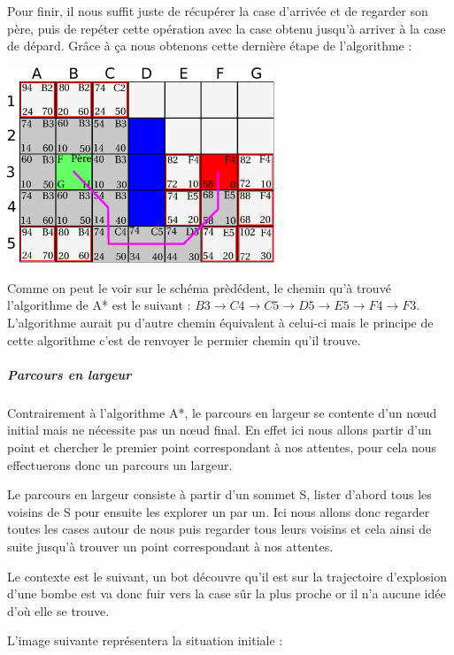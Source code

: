 			Pour finir, il nous suffit juste de récupérer la case d'arrivée et de regarder son père, puis de repéter cette opération avec la case obtenu jusqu'à arriver à la case de dépard. Grâce à ça nous obtenons cette dernière étape de l'algorithme :
			\begin{center}
				\includegraphics[width=8cm]{./Analyse/Img/Grille6.eps}
			\end{center}
		
			Comme on peut le voir sur le schéma prèdédent, le chemin qu'à trouvé l'algorithme de A* est le suivant : $ B3 \rightarrow C4 \rightarrow C5 \rightarrow D5 \rightarrow E5 \rightarrow F4 \rightarrow F3 $. L'algorithme aurait pu d'autre chemin équivalent à celui-ci mais le principe de cette algorithme c'est de renvoyer le permier chemin qu'il trouve.
		
		\subparagraph{Parcours en largeur\\}
		
			Contrairement à l'\gls{algorithme} A*, le parcours en largeur se contente d'un
			nœud initial mais ne nécessite pas un nœud final.
			En effet ici nous allons partir d'un point et chercher le premier point
			correspondant à nos attentes, pour cela nous effectuerons donc un parcours un
			largeur.
			
			Le parcours en largeur consiste à partir d'un sommet S, lister d'abord
			tous les voisins de S pour ensuite les explorer un par un.
			Ici nous allons donc regarder toutes les cases autour de nous puis regarder
			tous leurs voisins et cela ainsi de suite jusqu'à trouver un point
			correspondant à nos attentes.
			
			Le contexte est le suivant, un \gls{bot} découvre qu'il est sur la trajectoire
			d'explosion d'une bombe est va donc fuir vers la case sûr la plus proche or
			il n'a aucune idée d'où elle se trouve.
			
			L'image suivante représentera la situation initiale :
			
